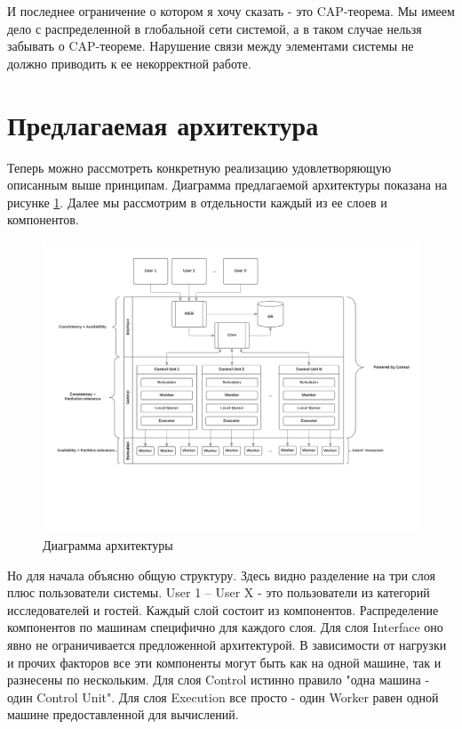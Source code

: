 И последнее ограничение о котором я хочу сказать - это CAP-теорема. Мы имеем дело с распределенной в глобальной сети системой, а в таком случае нельзя забывать о CAP-теореме. Нарушение связи между элементами системы не должно приводить к ее некорректной работе.

\section{Предлагаемая архитектура}

Теперь можно рассмотреть конкретную реализацию удовлетворяющую описанным выше принципам. Диаграмма предлагаемой архитектуры показана на рисунке \ref{fig:architecture}. Далее мы рассмотрим в отдельности каждый из ее слоев и компонентов.

\begin{figure}
	\centering
	\includegraphics[width=\textwidth]{fig/architecture}
	\caption{Диаграмма архитектуры}\label{fig:architecture}
\end{figure}

Но для начала объясню общую структуру. Здесь видно разделение на три слоя плюс пользователи системы. User 1 -- User X - это пользователи из категорий исследователей и гостей. Каждый слой состоит из компонентов. Распределение компонентов по машинам специфично для каждого слоя. Для слоя Interface оно явно не ограничивается предложенной архитектурой. В зависимости от нагрузки и прочих факторов все эти компоненты могут быть как на одной машине, так и разнесены по нескольким. Для слоя Control истинно правило "одна машина - один Control Unit". Для слоя Execution все просто - один Worker равен одной машине предоставленной для вычислений.

